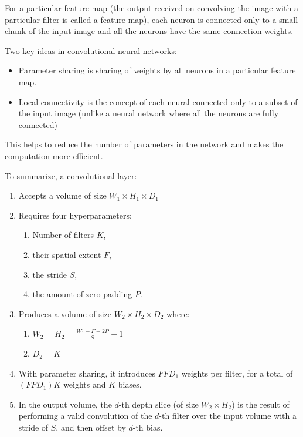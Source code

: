 For a particular feature map (the output received on convolving the image with a particular filter is called a feature map), each neuron is connected only to a small chunk of the input image and all the neurons have the same connection weights.

Two key ideas in convolutional neural networks:

\begin{itemize}
    \item Parameter sharing is sharing of weights by all neurons in a particular feature map.
    \item Local connectivity is the concept of each neural connected only to a subset of the input image (unlike a neural network where all the neurons are fully connected)
\end{itemize}

This helps to reduce the number of parameters in the network and makes the computation more efficient.

To summarize, a convolutional layer:

\begin{enumerate}
    \item Accepts a volume of size $W_1 \times H_1 \times D_1$
    \item Requires four hyperparameters:
    \begin{enumerate}
        \item Number of filters $K$,
        \item their spatial extent $F$,
        \item the stride $S$,
        \item the amount of zero padding $P$.
    \end{enumerate}
    \item Produces a volume of size $W_2 \times H_2 \times D_2$ where:
    \begin{enumerate}
        \item $W_2 = H_2 = \frac{W_1 - F + 2P}{S} + 1$
        \item $D_2 = K$
    \end{enumerate}
    \item With parameter sharing, it introduces $F F D_1$ weights per filter, for a total of $(F F D_1) K$ weights and $K$ biases.
    \item In the output volume, the $d$-th depth slice (of size $W_2 \times H_2$) is the result of performing a valid convolution of the $d$-th filter over the input volume with a stride of $S$, and then offset by $d$-th bias.
\end{enumerate}

